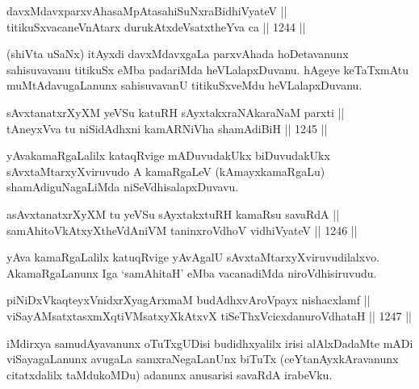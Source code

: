 
\begin{shl}
davxMdavxparxvAhasaMpAtasahiSuNxraBidhiVyateV || \\
titikuSxvacaneVnAtarx durukAtxdeVsatxtheYva ca \hfill || 1244 ||  
\end{shl}

\begin{artha}
(shiVta uSaNx) itAyxdi davxMdavxgaLa parxvAhada hoDetavanunx sahisuvavanu titikuSx eMba padariMda heVLalapxDuvanu. hAgeye keTaTxmAtu muMtAdavugaLanunx sahisuvavanU titikuSxveMdu heVLalapxDuvanu.
\end{artha}

\begin{shl}
sAvxtanatxrXyXM yeVSu katuRH sAyxtakxraNAkaraNaM parxti || \\
tAneyxVva tu niSidAdhxni kamARNiVha shamAdiBiH \hfill || 1245 ||  
\end{shl}

\begin{artha}
yAvakamaRgaLalilx kataqRvige mADuvudakUkx biDuvudakUkx sAvxtaMtarxyXviruvudo A kamaRgaLeV (kAmayxkamaRgaLu) shamAdiguNagaLiMda niSeVdhisalapxDuvavu.
\end{artha}

\begin{shl}
asAvxtanatxrXyXM tu yeVSu sAyxtakxtuRH kamaRsu savaRdA || \\
samAhitoVkAtxyX\s theVdAniVM taninxroVdhoV vidhiVyateV \hfill || 1246 || 
\end{shl}

\begin{artha}
yAva kamaRgaLalilx katuqRvige yAvAgalU sAvxtaMtarxyXviruvudilalxvo. AkamaRgaLanunx Iga `samAhitaH' eMba vacanadiMda niroVdhisiruvudu.
\end{artha}

\begin{shl}
piNiDxVkaqteyxVnidxrXyagArxmaM budAdhxvAroVpayx nishacxlamf || \\
viSayAMsatxtasxmXqtiVMsatxyXkAtxvX tiSeThxVcicxdanuroVdhataH \hfill || 1247 ||  
\end{shl}

\begin{artha}
iMdirxya samudAyavanunx oTuTxgUDisi budidhxyalilx irisi alAlxDadaMte mADi viSayagaLanunx avugaLa samxraNegaLanUnx biTuTx (ceYtanAyxkAravanunx citatxdalilx taMdukoMDu) adanunx anusarisi savaRdA irabeVku.
\end{artha}

